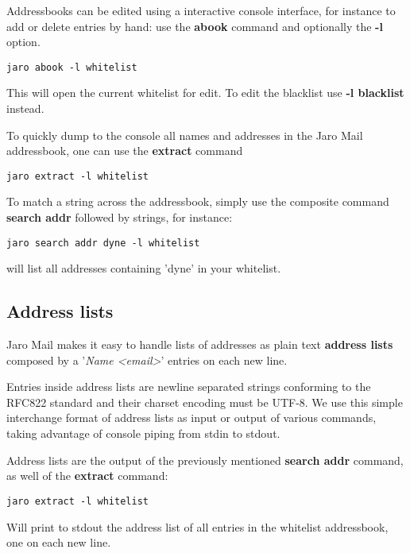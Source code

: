 \documentclass[a4,onecolumn,portrait]{article}
\begin{document}
Addressbooks can be edited using a interactive console interface, for instance to add or delete entries by hand: use the \textbf{abook} command and optionally the \textbf{-l} option.

\begin{verbatim}
jaro abook -l whitelist
\end{verbatim}

This will open the current whitelist for edit. To edit the blacklist use \textbf{-l blacklist} instead.

To quickly dump to the console all names and addresses in the Jaro
Mail addressbook, one can use the \textbf{extract} command

\begin{verbatim}
jaro extract -l whitelist
\end{verbatim}

To match a string across the addressbook, simply use the composite
command \textbf{search addr} followed by strings, for instance:

\begin{verbatim}
jaro search addr dyne -l whitelist
\end{verbatim}

will list all addresses containing 'dyne' in your whitelist.

\subsection{Address lists}
\label{sec-7-1}

Jaro Mail makes it easy to handle lists of addresses as plain text \textbf{address lists} composed by a '\emph{Name <email>}' entries on each new line.

Entries inside address lists are newline separated strings conforming to the RFC822 standard and their charset encoding must be UTF-8.   We use this simple interchange format of address lists as input or output of various commands, taking advantage of console piping from stdin to stdout.

Address lists are the output of the previously mentioned \textbf{search addr} command, as well of the \textbf{extract} command:

\begin{verbatim}
jaro extract -l whitelist
\end{verbatim}

Will print to stdout the address list of all entries in the whitelist addressbook, one on each new line.
\end{document}
